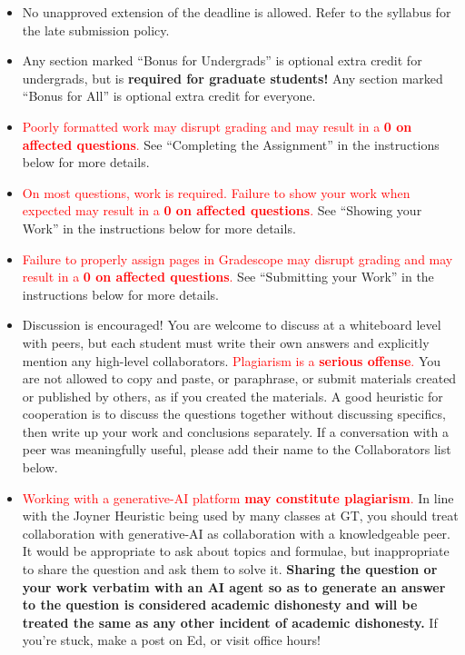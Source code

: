 \begin{itemize}
    \itemsep0.1em
    \item No unapproved extension of the deadline is allowed. Refer to the syllabus for the late submission policy.
    \item Any section marked ``Bonus for Undergrads'' is optional extra credit for undergrads, but is \textbf{required for graduate students!} Any section marked ``Bonus for All'' is optional extra credit for everyone.
    \item \textcolor{red}{Poorly formatted work may disrupt grading and may result in a \textbf{0 on affected questions}.} See ``Completing the Assignment'' in the instructions below for more details.
    \item \textcolor{red}{On most questions, work is required. Failure to show your work when expected may result in a \textbf{0 on affected questions}.} See ``Showing your Work'' in the instructions below for more details.
    \item \textcolor{red}{Failure to properly assign pages in Gradescope may disrupt grading and may result in a \textbf{0 on affected questions}.} See ``Submitting your Work'' in the instructions below for more details.
    \item Discussion is encouraged! You are welcome to discuss at a whiteboard level with peers, but each student must write their own answers and explicitly mention any high-level collaborators. \textcolor{red}{Plagiarism is a \textbf{serious offense}.} You are not allowed to copy and paste, or paraphrase, or submit materials created or published by others, as if you created the materials. A good heuristic for cooperation is to discuss the questions together without discussing specifics, then write up your work and conclusions separately. If a conversation with a peer was meaningfully useful, please add their name to the Collaborators list below.
    \item \textcolor{red}{Working with a generative-AI platform \textbf{may constitute plagiarism}.} In line with the Joyner Heuristic being used by many classes at GT, you should treat collaboration with generative-AI as collaboration with a knowledgeable peer. It would be appropriate to ask about topics and formulae, but inappropriate to share the question and ask them to solve it. \textbf{Sharing the question or your work verbatim with an AI agent so as to generate an answer to the question is considered academic dishonesty and will be treated the same as any other incident of academic dishonesty.} If you're stuck, make a post on Ed, or visit office hours!

\end{itemize}
